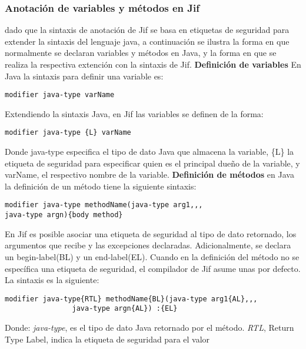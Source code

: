 \subsubsection{Anotación de variables y métodos en Jif}
\label{sssec:sintaxis}
dado que la sintaxis de anotación de Jif se basa en etiquetas de seguridad para
extender la sintaxis del lenguaje java, a continuación se ilustra la forma en
que normalmente se declaran variables y métodos en Java, y la forma en que se
realiza la respectiva extención con la sintaxis de Jif.\newline
\textbf{Definición de variables}\newline
En Java la sintaxis para definir una variable es:
\begin{lstlisting}[basicstyle=\scriptsize]
	modifier java-type varName
\end{lstlisting}
Extendiendo la sintaxis Java, en Jif las variables se definen de la forma:
\begin{lstlisting}[basicstyle=\scriptsize]
	modifier java-type {L} varName
\end{lstlisting}
Donde java-type especifica el tipo de dato Java que almacena la variable, \{L\}
la etiqueta de seguridad  para especificar quien es el principal dueño de la
variable, y varName, el respectivo nombre de la variable.\newline
\textbf{Definición de métodos}\newline
en Java la definición de un método tiene la siguiente sintaxis:
\begin{lstlisting}[basicstyle=\scriptsize]
modifier java-type methodName(java-type arg1,,, 
java-type argn){body method}
\end{lstlisting}
En Jif  es posible asociar una etiqueta de seguridad al tipo de dato retornado,
los argumentos que recibe y las excepciones declaradas. 
Adicionalmente, se declara un begin-label(BL) y un end-label(EL).\newline
Cuando en la definición del método no se específica una etiqueta de seguridad,
el compilador de Jif asume unas por defecto. 
La sintaxis es la siguiente:
\begin{lstlisting}[basicstyle=\scriptsize]
modifier java-type{RTL} methodName{BL}(java-type arg1{AL},,,
				java-type argn{AL}) :{EL}
\end{lstlisting}
Donde: \emph{java-type}, es el tipo de dato Java retornado por el
método.\newline 
\emph{RTL}, Return Type Label, indica la etiqueta de seguridad para el valor
